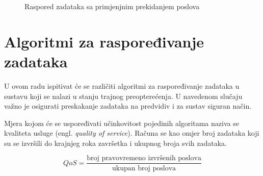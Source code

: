 \documentclass[../zavrsni.tex]{subfiles}
\begin{document}
\begin{figure}[h!]
  \centering

  \begin{RTGrid}[width=13cm]{3}{24}

  

  

  

  \end{RTGrid}

  \caption{Raspored zadataka sa primjenjnim prekidanjem poslova}
  \label{fig:ex1}
\end{figure}

\section{Algoritmi za raspoređivanje zadataka}

U ovom radu ispitivat će se različiti algoritmi za raspoređivanje zadataka u sustavu koji se nalazi u stanju trajnog preopterećenja.
U navedenom slučaju važno je osigurati preskakanje zadataka na predvidiv i za sustav siguran način.

Mjera kojom će se uspoređivati učinkovitost pojedinih algoritama naziva se kvaliteta usluge (engl. \textit{quality of service}).
Računa se kao omjer broj zadataka koji su se izvršili do krajnjeg roka završetka i ukupnog broja svih zadataka.

\begin{equation*}
    QoS = \frac{\text{broj pravovremeno izvršenih poslova}}{\text{ukupan broj poslova}}
\end{equation*}
\end{document}
